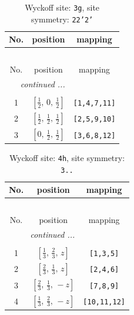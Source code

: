 \documentclass[fleqn,8pt]{jsarticle}
\begin{document}
\begin{longtable}{ccc}
\caption{Wyckoff site: {\tt 3g}, site symmetry: {\tt 22'2'}}
 \\
 \hline \hline
No. & position & mapping \\ \hline \endfirsthead

\multicolumn{2}{l}{\tablename\ \thetable{}} \\
 \hline \hline
No. & position & mapping \\ \hline \endhead

 \hline \hline
\multicolumn{2}{r}{\footnotesize\it continued ...} \\ \endfoot

 \hline \hline
\multicolumn{2}{r}{} \\ \endlastfoot

1 & $\left[ \frac{1}{2},\, 0,\, \frac{1}{2} \right]$ & {\tt [1,4,7,11]} \\ \hline
2 & $\left[ \frac{1}{2},\, \frac{1}{2},\, \frac{1}{2} \right]$ & {\tt [2,5,9,10]} \\ \hline
3 & $\left[ 0,\, \frac{1}{2},\, \frac{1}{2} \right]$ & {\tt [3,6,8,12]} \\
\end{longtable}
\renewcommand{\arraystretch}{1.2}
\begin{longtable}{ccc}
\caption{Wyckoff site: {\tt 4h}, site symmetry: {\tt 3..}}
 \\
 \hline \hline
No. & position & mapping \\ \hline \endfirsthead

\multicolumn{2}{l}{\tablename\ \thetable{}} \\
 \hline \hline
No. & position & mapping \\ \hline \endhead

 \hline \hline
\multicolumn{2}{r}{\footnotesize\it continued ...} \\ \endfoot

 \hline \hline
\multicolumn{2}{r}{} \\ \endlastfoot

1 & $\left[ \frac{1}{3},\, \frac{2}{3},\, z \right]$ & {\tt [1,3,5]} \\ \hline
2 & $\left[ \frac{2}{3},\, \frac{1}{3},\, z \right]$ & {\tt [2,4,6]} \\ \hline
3 & $\left[ \frac{2}{3},\, \frac{1}{3},\, - z \right]$ & {\tt [7,8,9]} \\ \hline
4 & $\left[ \frac{1}{3},\, \frac{2}{3},\, - z \right]$ & {\tt [10,11,12]} \\
\end{longtable}
\end{document}
